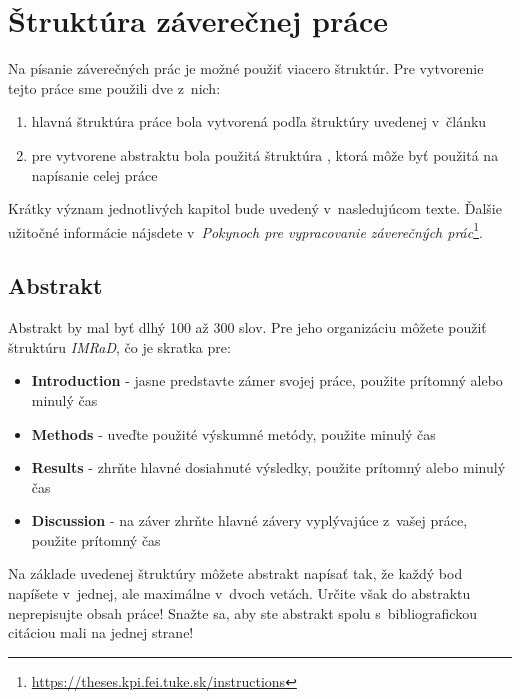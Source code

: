 
\chapter{Štruktúra záverečnej práce}\label{app:structure}

Na písanie záverečných prác je možné použiť viacero štruktúr. Pre vytvorenie tejto práce sme použili dve z~nich:

\begin{enumerate}
    \item hlavná štruktúra práce bola vytvorená podľa štruktúry uvedenej v~článku \cite{Beel2010}
    \item pre vytvorene abstraktu bola použitá štruktúra \cite{WikipediaImrad}, ktorá môže byť použitá na napísanie celej práce
\end{enumerate}

Krátky význam jednotlivých kapitol bude uvedený v~nasledujúcom texte. Ďalšie užitočné informácie nájsdete v~\emph{Pokynoch pre vypracovanie záverečných prác}\footnote{\url{https://theses.kpi.fei.tuke.sk/instructions}}.


\section*{Abstrakt}


Abstrakt by mal byť dlhý 100 až 300 slov. Pre jeho organizáciu môžete použiť štruktúru \emph{IMRaD}, čo je skratka pre:

\begin{itemize}
    \item \textbf{Introduction} - jasne predstavte zámer svojej práce, použite prítomný alebo minulý čas
    \item \textbf{Methods} - uveďte použité výskumné metódy, použite minulý čas
    \item \textbf{Results} - zhrňte hlavné dosiahnuté výsledky, použite prítomný alebo minulý čas
    \item \textbf{Discussion} - na záver zhrňte hlavné závery vyplývajúce z~vašej práce, použite prítomný čas
\end{itemize}

Na základe uvedenej štruktúry môžete abstrakt napísať tak, že každý bod napíšete v~jednej, ale maximálne v~dvoch vetách. Určite však do abstraktu neprepisujte obsah práce! Snažte sa, aby ste abstrakt spolu s~bibliografickou citáciou mali na jednej strane!


